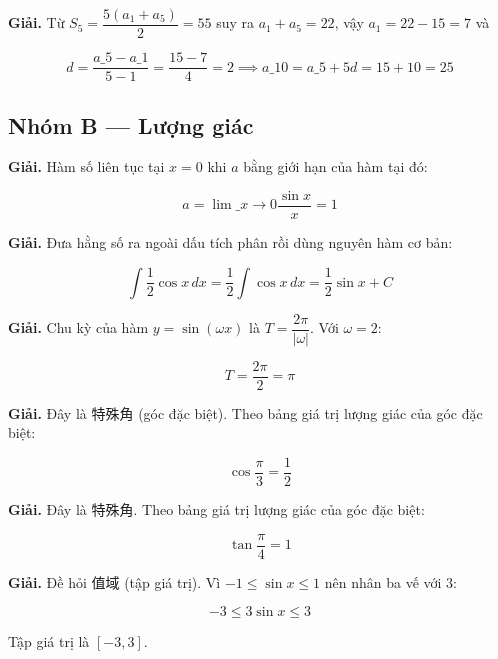 \documentclass[11pt, a4paper]{article}
\begin{document}
\begin{dapan}[13 — Đáp án D]
\textbf{Giải.} Từ $S_5 = \dfrac{5(a_1 + a_5)}{2} = 55$ suy ra $a_1 + a_5 = 22$, vậy $a_1 = 22 - 15 = 7$ và

$$d = \frac{a\_5 - a\_1}{5 - 1} = \frac{15 - 7}{4} = 2 \implies a\_{10} = a\_5 + 5d = 15 + 10 = 25$$
\end{dapan}

\subsection*{Nhóm B — Lượng giác}

\begin{dapan}[14 — Đáp án C]
\textbf{Giải.} Hàm số liên tục tại $x = 0$ khi $a$ bằng giới hạn của hàm tại đó:

$$a = \lim\_{x \to 0} \frac{\sin x}{x} = 1$$
\end{dapan}

\begin{dapan}[15 — Đáp án A]
\textbf{Giải.} Đưa hằng số ra ngoài dấu tích phân rồi dùng nguyên hàm cơ bản:

$$\int \frac{1}{2}\cos x\,dx = \frac{1}{2}\int \cos x\,dx = \frac{1}{2}\sin x + C$$
\end{dapan}

\begin{dapan}[16 — Đáp án B]
\textbf{Giải.} Chu kỳ của hàm $y = \sin(\omega x)$ là $T = \dfrac{2\pi}{\lvert \omega \rvert}$. Với $\omega = 2$:

$$T = \frac{2\pi}{2} = \pi$$
\end{dapan}

\begin{dapan}[17 — Đáp án D]
\textbf{Giải.} Đây là 特殊角 (góc đặc biệt). Theo bảng giá trị lượng giác của góc đặc biệt:

$$\cos\frac{\pi}{3} = \frac{1}{2}$$
\end{dapan}

\begin{dapan}[18 — Đáp án C]
\textbf{Giải.} Đây là 特殊角. Theo bảng giá trị lượng giác của góc đặc biệt:

$$\tan\frac{\pi}{4} = 1$$
\end{dapan}

\begin{dapan}[19 — Đáp án A]
\textbf{Giải.} Đề hỏi 值域 (tập giá trị). Vì $-1 \le \sin x \le 1$ nên nhân ba vế với $3$:

$$-3 \le 3\sin x \le 3$$

Tập giá trị là $[-3, 3]$.
\end{dapan}
\end{document}
